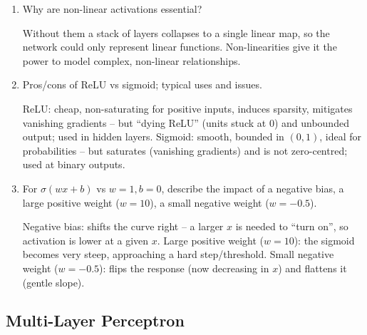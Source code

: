\documentclass[10pt,a4paper]{article}
\newcommand{\q}[1]{\item #1}
\begin{document}
\begin{enumerate}[leftmargin=*,label=\textbf{Q\arabic*.}]

\q Why are non-linear activations essential?
\begin{answerbox}
Without them a stack of layers collapses to a single linear map, so the network could only represent linear functions. Non-linearities give it the power to model complex, non-linear relationships.
\end{answerbox}

\q Pros/cons of ReLU vs sigmoid; typical uses and issues.
\begin{answerbox}
ReLU: cheap, non-saturating for positive inputs, induces sparsity, mitigates vanishing gradients -- but ``dying ReLU'' (units stuck at 0) and unbounded output; used in hidden layers. Sigmoid: smooth, bounded in $(0,1)$, ideal for probabilities -- but saturates (vanishing gradients) and is not zero-centred; used at binary outputs.
\end{answerbox}

\q For $\sigma(wx+b)$ vs $w=1,b=0$, describe the impact of a negative bias, a large positive weight ($w=10$), a small negative weight ($w=-0.5$).
\begin{answerbox}
Negative bias: shifts the curve right -- a larger $x$ is needed to ``turn on'', so activation is lower at a given $x$. Large positive weight ($w=10$): the sigmoid becomes very steep, approaching a hard step/threshold. Small negative weight ($w=-0.5$): flips the response (now decreasing in $x$) and flattens it (gentle slope).
\end{answerbox}

\end{enumerate}

\subsection{Multi-Layer Perceptron}
\end{document}
